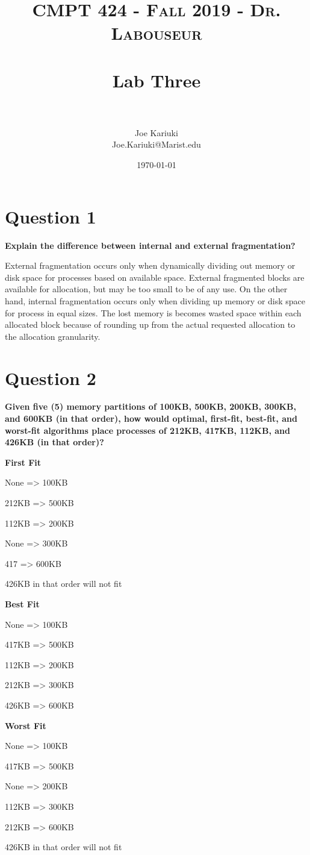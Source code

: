 \documentclass[letterpaper, 10pt,DIV=13]{scrartcl}
\title{	
   \normalfont \normalsize 
   \textsc{CMPT 424 - Fall 2019 - Dr. Labouseur} \\[10pt] %
   \horrule{0.5pt} \\[0.25cm] 	%
   \huge Lab Three  \\     	    %
   \horrule{0.5pt} \\[0.25cm] 	%
}
\author{Joe Kariuki \\ \normalsize Joe.Kariuki@Marist.edu}
\date{\normalsize\today} 	%
\numberwithin{equation}{section} %
\numberwithin{figure}{section} %
\numberwithin{table}{section} %
\begin{document}
\maketitle %

\section{Question 1}

\textbf{ Explain	the	difference	between	 internal	and	external	fragmentation?	
}


External fragmentation occurs only when dynamically dividing out memory or disk space for processes based on available space. External fragmented blocks are available for allocation, but may be too small to be of any use. On the other hand, internal fragmentation occurs only when dividing up memory or disk space for process in equal sizes. The lost memory is becomes wasted space within each allocated block because of rounding up from the actual requested allocation to the allocation granularity.


\section{Question 2}

\textbf{ Given	five (5) memory	partitions	of	100KB,	500KB,	200KB,	300KB,	and	600KB	(in	that order),	how	would	optimal,	first-fit,	best-fit,	and	worst-fit	algorithms	place	processes of	212KB,	417KB,	112KB,	and	426KB	(in	that order)?	
}

\textbf{First Fit
}

None => 100KB

212KB => 500KB

112KB => 200KB

None => 300KB

417 => 600KB

426KB in that order will not fit

\textbf{Best Fit
}

None => 100KB

417KB => 500KB

112KB => 200KB

212KB => 300KB

426KB => 600KB

\textbf{Worst Fit
}

None => 100KB

417KB => 500KB

None => 200KB

112KB => 300KB

212KB => 600KB

426KB in that order will not fit
\end{document}
